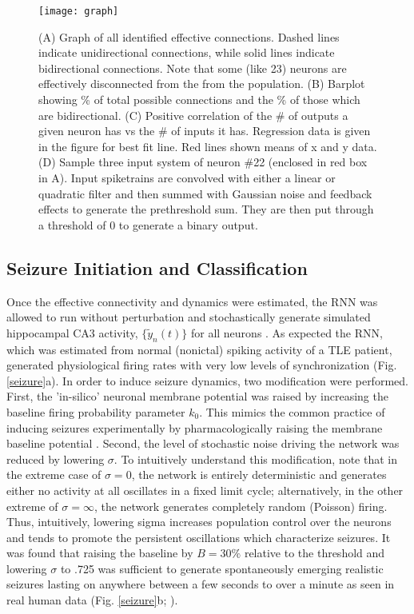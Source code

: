 \documentclass[11pt,a4paper,final]{article}
\begin{document}
\begin{figure}[!ht]
\centering
\texttt{[image: graph]}
\caption[Graph \& Example System]{
(A) Graph of all identified effective connections. Dashed lines indicate unidirectional connections, while solid lines indicate bidirectional connections. Note that some (like 23) neurons are effectively disconnected from the from the population.
(B) Barplot showing \% of total possible connections and the \% of those which are bidirectional.
(C) Positive correlation of the \# of outputs a given neuron has vs the \# of inputs it has. Regression data is given in the figure for best fit line. Red lines shown means of x and y data.
(D) Sample three input system of neuron \#22 (enclosed in red box in A). Input spiketrains are convolved with either a linear or quadratic filter and then summed with Gaussian noise and feedback effects to generate the prethreshold sum. They are then put through a threshold of 0 to generate a binary output.}
\label{graph}
\end{figure}

    \subsection{Seizure Initiation and Classification}

Once the effective connectivity and dynamics were estimated, the RNN was allowed to run without perturbation and stochastically generate simulated hippocampal CA3 activity, $\{\tilde{y}_n(t)\}$ for all \nn{} neurons \citep{pillow08}.
As expected the RNN, which was estimated from normal (nonictal) spiking activity of a TLE patient, generated physiological firing rates with very low levels of synchronization (Fig. \ref{seizure}a).
In order to induce seizure dynamics, two modification were performed.
First, the 'in-silico' neuronal membrane potential was raised by increasing the baseline firing probability parameter $k_0$.
This mimics the common practice of inducing seizures experimentally by pharmacologically raising the membrane baseline potential \citep{fricker99,avoli02}.
Second, the level of stochastic noise driving the network was reduced by lowering $\sigma$.
To intuitively understand this modification, note that in the extreme case of $\sigma=0$, the network is entirely deterministic and generates either no activity at all oscillates in a fixed limit cycle;
alternatively, in the other extreme of $\sigma=\infty$, the network generates completely random (Poisson) firing.
Thus, intuitively, lowering sigma increases population control over the neurons and tends to promote the persistent oscillations which characterize seizures.
It was found that raising the baseline by $B=30\%$ relative to the threshold and lowering $\sigma$ to .725 was sufficient to generate spontaneously emerging realistic seizures lasting on anywhere between a few seconds to over a minute as seen in real human data (Fig. \ref{seizure}b; \citet{bower12,truccolo14}).	
\end{document}
